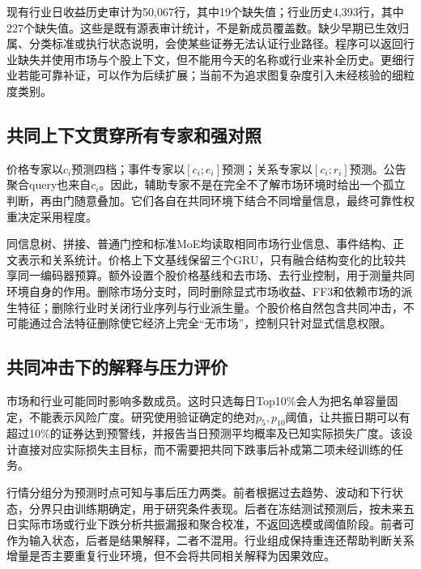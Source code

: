 现有行业日收益历史审计为50,067行，其中19个缺失值；行业历史4,393行，其中227个缺失值。这些是既有源表审计统计，不是新成员覆盖数。缺少早期已生效归属、分类标准或执行状态说明，会使某些证券无法认证行业路径。程序可以返回行业缺失并使用市场与个股上下文，但不能用今天的名称或行业来补全历史。更细行业若能可靠补证，可以作为后续扩展；当前不为追求图复杂度引入未经核验的细粒度类别。

\subsection{共同上下文贯穿所有专家和强对照}
价格专家以$c_i$预测四档；事件专家以$[c_i;e_i]$预测；关系专家以$[c_i;r_i]$预测。公告聚合query也来自$c_i$。因此，辅助专家不是在完全不了解市场环境时给出一个孤立判断，再由门随意叠加。它们各自在共同环境下结合不同增量信息，最终可靠性权重决定采用程度。

同信息树、拼接、普通门控和标准MoE均读取相同市场行业信息、事件结构、正文表示和关系统计。价格上下文基线保留三个GRU，只有融合结构变化的比较共享同一编码器预算。额外设置个股价格基线和去市场、去行业控制，用于测量共同环境自身的作用。删除市场分支时，同时删除显式市场收益、FF3和依赖市场的派生特征；删除行业时关闭行业序列与行业派生量。个股价格自然包含共同冲击，不可能通过合法特征删除使它经济上完全“无市场”，控制只针对显式信息权限。

\subsection{共同冲击下的解释与压力评价}
市场和行业可能同时影响多数成员。这时只选每日Top10\%会人为把名单容量固定，不能表示风险广度。研究使用验证确定的绝对$p_5,p_{10}$阈值，让共振日期可以有超过10\%的证券达到预警线，并报告当日预测平均概率及已知实际损失广度。该设计直接对应实际损失主目标，而不需要把共同下跌事后补成第二项未经训练的任务。

行情分组分为预测时点可知与事后压力两类。前者根据过去趋势、波动和下行状态，分界只由训练期确定，用于研究条件表现。后者在冻结测试预测后，按未来五日实际市场或行业下跌分析共振漏报和聚合校准，不返回选模或阈值阶段。前者可作为输入状态，后者是结果解释，二者不混用。行业组成保持重连还帮助判断关系增量是否主要重复行业环境，但不会将共同相关解释为因果效应。

